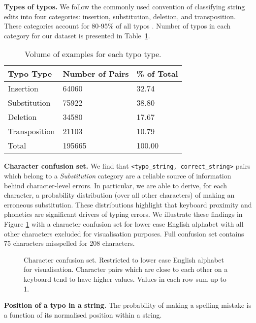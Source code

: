 \documentclass[11pt,a4paper]{article}
\begin{document}
\textbf{Types of typos.} We follow the commonly used convention of classifying string edits into four categories: insertion, substitution, deletion, and transposition. These categories account for 80-95\% of all typos \cite{Martins2004}. Number of typos in each category for our dataset is presented in Table~\ref{tab:typo_cnts_table}.

\begin{table}[H]
\centering
\begin{tabular}{lll}
    \toprule
    Typo Type&Number of Pairs&\% of Total\\
    \midrule
    Insertion&64060&32.74\\
    Substitution&75922&38.80\\
    Deletion&34580&17.67\\
    Transposition&21103&10.79\\
    \midrule
    Total&195665&100.00\\
    \bottomrule
\end{tabular}
\caption[Number of examples per typo type.]{Volume of examples for each typo type.}
\label{tab:typo_cnts_table}
\end{table}

\textbf{Character confusion set.} We find that \texttt{<typo\_string, correct\_string>} pairs which belong to a \textit{Substitution} category are a reliable source of information behind character-level errors. In particular, we are able to derive, for each character, a probability distribution (over all other characters) of making an erroneous substitution. These distributions highlight that keyboard proximity and phonetics are significant drivers of typing errors. We illustrate these findings in Figure \ref{fig:confusion_set} with a character confusion set for lower case English alphabet with all other characters excluded for visualisation purposes. Full confusion set contains 75 characters misspelled for 208 characters.
\begin{figure}[htbp]
\caption{Character confusion set. Restricted to lower case English alphabet for visualisation. Character pairs which are close to each other on a keyboard tend to have higher values. Values in each row sum up to 1.}
\label{fig:confusion_set}
\end{figure}

\textbf{Position of a typo in a string.}
The probability of making a spelling mistake is a function of its normalised position within a string. 
\end{document}
